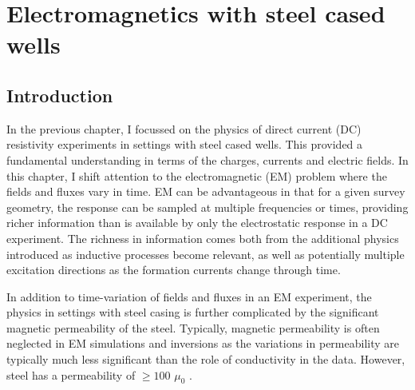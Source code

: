 
\chapter{Electromagnetics with steel cased wells}
\label{ch:casing-em}

\section{Introduction}
In the previous chapter, I focussed on the physics of direct current (DC) resistivity experiments in settings with steel cased wells. This provided a fundamental understanding in terms of the charges, currents and electric fields. In this chapter, I shift attention to the electromagnetic (EM) problem where the fields and fluxes vary in time. EM can be advantageous in that for a given survey geometry, the response can be sampled at multiple frequencies or times, providing richer information than is available by only the electrostatic response in a DC experiment. The richness in information comes both from the additional physics introduced as inductive processes become relevant, as well as potentially multiple excitation directions as the formation currents change through time.

In addition to time-variation of fields and fluxes in an EM experiment, the physics in settings with steel casing is further complicated by the significant magnetic permeability of the steel. Typically, magnetic permeability is often neglected in EM simulations and inversions as the variations in permeability are typically much less significant than the role of conductivity in the data. However, steel has a permeability of $\geq 100$ $\mu_0$ \citep{wuhabashy1994}.

